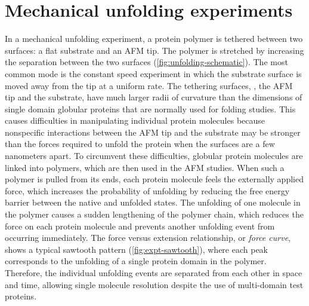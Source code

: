 \section{Mechanical unfolding experiments}
\label{sec:procedure}

In a mechanical unfolding experiment, a protein polymer is tethered
between two surfaces: a flat substrate and an AFM tip.  The polymer is
stretched by increasing the separation between the two surfaces
(\cref{fig:unfolding-schematic}).  The most common mode is the
constant speed experiment in which the substrate surface is moved away
from the tip at a uniform rate.  The tethering surfaces, \ie, the AFM
tip and the substrate, have much larger radii of curvature than the
dimensions of single domain globular proteins that are normally used
for folding studies.  This causes difficulties in manipulating
individual protein molecules because nonspecific interactions between
the AFM tip and the substrate may be stronger than the forces required
to unfold the protein when the surfaces are a few nanometers apart.
To circumvent these difficulties, globular protein molecules are
linked into polymers, which are then used in the AFM
studies\citep{carrion-vazquez99a,chyan04,carrion-vazquez03}.  When
such a polymer is pulled from its ends, each protein molecule feels
the externally applied force, which increases the probability of
unfolding by reducing the free energy barrier between the native and
unfolded states.  The unfolding of one molecule in the polymer causes
a sudden lengthening of the polymer chain, which reduces the force on
each protein molecule and prevents another unfolding event from
occurring immediately.  The force versus extension relationship, or
\emph{force curve}, shows a typical sawtooth pattern
(\cref{fig:expt-sawtooth}), where each peak corresponds to the
unfolding of a single protein domain in the polymer.  Therefore, the
individual unfolding events are separated from each other in space and
time, allowing single molecule resolution despite the use of
multi-domain test proteins.
%

